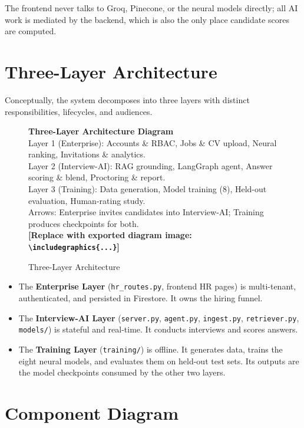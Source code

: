 \documentclass[12pt,a4paper,oneside]{report}
\newcommand{\diagramplaceholder}[1]{%
  \begin{tcolorbox}[
    colback=gray!5, colframe=gray!50,
    boxrule=0.4pt, arc=2pt,
    left=10pt, right=10pt, top=8pt, bottom=8pt,
    fontupper=\small\itshape
  ]
  \centering #1\\[4pt]
  \textbf{[Replace with exported diagram image: \texttt{\textbackslash includegraphics\{...\}}]}
  \end{tcolorbox}%
}
\begin{document}
The frontend never talks to Groq, Pinecone, or the neural models directly; all AI work is
mediated by the backend, which is also the only place candidate scores are computed.

\section{Three-Layer Architecture}

Conceptually, the system decomposes into three layers with distinct responsibilities,
lifecycles, and audiences.

\begin{figure}[H]
\centering
\diagramplaceholder{%
  \textbf{Three-Layer Architecture Diagram}\\
  Layer 1 (Enterprise): Accounts \& RBAC, Jobs \& CV upload, Neural ranking, Invitations \& analytics.\\
  Layer 2 (Interview-AI): RAG grounding, LangGraph agent, Answer scoring \& blend, Proctoring \& report.\\
  Layer 3 (Training): Data generation, Model training (8), Held-out evaluation, Human-rating study.\\
  Arrows: Enterprise invites candidates into Interview-AI; Training produces checkpoints for both.%
}
\caption{Three-Layer Architecture}
\label{fig:threelayer}
\end{figure}

\begin{itemize}
  \item The \textbf{Enterprise Layer} (\texttt{hr\_routes.py}, frontend HR pages) is
    multi-tenant, authenticated, and persisted in Firestore. It owns the hiring funnel.
  \item The \textbf{Interview-AI Layer} (\texttt{server.py}, \texttt{agent.py},
    \texttt{ingest.py}, \texttt{retriever.py}, \texttt{models/}) is stateful and real-time.
    It conducts interviews and scores answers.
  \item The \textbf{Training Layer} (\texttt{training/}) is offline. It generates data,
    trains the eight neural models, and evaluates them on held-out test sets. Its outputs are
    the model checkpoints consumed by the other two layers.
\end{itemize}

\section{Component Diagram}
\end{document}
